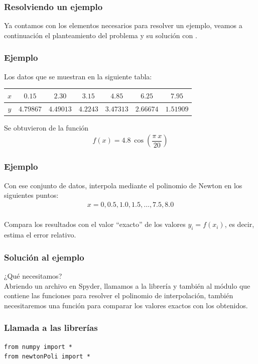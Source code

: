 \begin{frame}
\frametitle{Resolviendo un ejemplo}
Ya contamos con los elementos necesarios para resolver un ejemplo, veamos a continuación el planteamiento del problema y su solución con \python.
\end{frame}
\begin{frame}
\frametitle{Ejemplo}
Los datos que se muestran en la siguiente tabla:
\begin{table}[htbp]
\centering \small
\begin{tabulary}{15cm}{c | c | c | c | c | c | c}
$x$ & $0.15$ & $2.30$ & $3.15$ & $4.85$ & $6.25$ & $7.95$ \\
\midrule $y$ & $4.79867$ & $4.49013$ & $4.2243$ & $3.47313$ & $2.66674$ & $1.51909$
\end{tabulary}
\end{table}
Se obtuvieron de la función
\begin{align*}
f(x) = 4.8 \: \cos \left( \dfrac{\pi \: x}{20} \right)
\end{align*}
\end{frame}
\begin{frame}
\frametitle{Ejemplo}
Con ese conjunto de datos, interpola mediante el polinomio de Newton en los siguientes puntos:
\begin{align*}
x = 0, 0.5, 1.0, 1.5, \ldots, 7.5, 8.0
\end{align*}
\\
\bigskip
Compara los resultados con el valor \enquote{exacto} de los valores $y_{i} = f(x_{i})$, es decir, estima el error relativo.
\end{frame}
\begin{frame}[fragile]
\frametitle{Solución al ejemplo}
¿Qué necesitamos?
\\
\bigskip
Abriendo un archivo en Spyder, llamamos a la librería  y también al módulo  que contiene las funciones para resolver el polinomio de interpolación, también necesitaremos una función  para comparar los valores exactos con los obtenidos.
\end{frame}
\begin{frame}[fragile]
\frametitle{Llamada a las librerías}
\begin{lstlisting}[caption=Llamando a las librerías y módulos, style=FormattedNumber, basicstyle=\linespread{1.1}\ttfamily=\small, columns=fullflexible]
from numpy import *
from newtonPoli import *
\end{lstlisting}
\end{frame}

